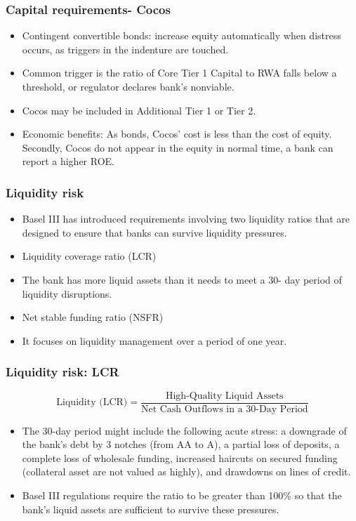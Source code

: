 \subsubsection{Capital requirements- Cocos}
\begin{itemize}
\item Contingent convertible bonds: increase equity automatically when distress occurs, as triggers in the indenture are touched.
\item Common trigger is the ratio of Core Tier 1 Capital to RWA falls below a threshold, or regulator declares bank's nonviable.
\item Cocos may be included in Additional Tier 1 or Tier 2.
\item Economic benefits: As bonds, Cocos' cost is less than the cost of equity. Secondly, Cocos do not appear in the equity in normal time, a bank can report a higher ROE.
\end{itemize}



\subsubsection{Liquidity risk}
\begin{itemize}
\item Basel III has introduced requirements involving two liquidity ratios that are designed to ensure that banks can survive liquidity pressures.
\item Liquidity coverage ratio (LCR)
\item The bank has more liquid assets than it needs to meet a 30- day period of liquidity disruptions.
\item Net stable funding ratio (NSFR)
\item It focuses on liquidity management over a period of one year.
\end{itemize}



\subsubsection{Liquidity risk: LCR}
    \begin{equation}
    \text{Liquidity (LCR)} = \frac{\text{High-Quality Liquid Assets}}{\text{Net Cash Outflows in a 30-Day Period}}
    \end{equation}
\begin{itemize}
\item The 30-day period might include the following acute stress: a downgrade of the bank's debt by 3 notches (from AA to A), a partial loss of deposits, a complete loss of wholesale funding, increased haircuts on secured funding (collateral asset are not valued as highly), and drawdowns on lines of credit.
\item Basel III regulations require the ratio to be greater than 100\% so that the bank's liquid assets are sufficient to survive these pressures.
\end{itemize}



